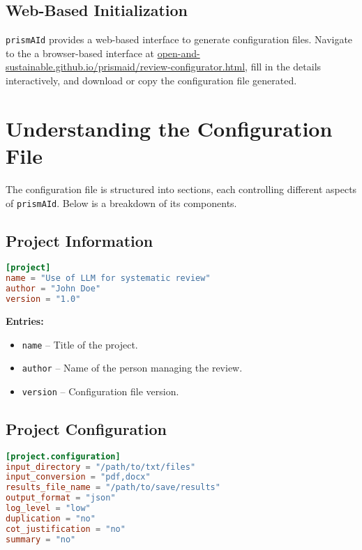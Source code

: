 \subsection{Web-Based Initialization}

\texttt{prismAId} provides a web-based interface to generate configuration files. Navigate to the a browser-based interface at \href{https://open-and-sustainable.github.io/prismaid/review-configurator.html}{open-and-sustainable.github.io/prismaid/review-configurator.html}, fill in the details interactively, and download or copy the configuration file generated.

\section{Understanding the Configuration File}

The configuration file is structured into sections, each controlling different aspects of \texttt{prismAId}. Below is a breakdown of its components.

\subsection{Project Information}

\begin{configbox}
\begin{lstlisting}[language=TOML]
[project]
name = "Use of LLM for systematic review"
author = "John Doe"
version = "1.0"
\end{lstlisting}
\end{configbox}

\textbf{Entries:}
\begin{itemize}
    \item \texttt{name} – Title of the project.
    \item \texttt{author} – Name of the person managing the review.
    \item \texttt{version} – Configuration file version.
\end{itemize}

\subsection{Project Configuration}

\begin{configbox}
\begin{lstlisting}[language=TOML]
[project.configuration]
input_directory = "/path/to/txt/files"
input_conversion = "pdf,docx"
results_file_name = "/path/to/save/results"
output_format = "json"
log_level = "low"
duplication = "no"
cot_justification = "no"
summary = "no"
\end{lstlisting}
\end{configbox}

